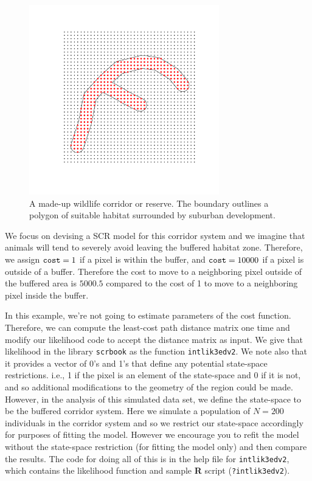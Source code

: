 \begin{figure}[h]
\begin{center}
\includegraphics[height=3.25in,width=3.25in]{Ch10-EcolDist/figs/corridor}
\end{center}
\caption{A made-up wildlife corridor or reserve. The boundary outlines
  a polygon of suitable habitat surrounded by suburban development.}
\label{ecoldist.fig.corridor}
\end{figure}


We focus on devising a SCR model for this corridor system and we
imagine that animals will tend to severely avoid leaving the buffered
habitat zone. Therefore, we assign $\mbox{\tt cost}=1$ if a pixel
is within the buffer,
and $\mbox{\tt cost} = 10000$ if a pixel is outside of a
buffer. Therefore the cost to move to a neighboring pixel outside of
the buffered area is $5000.5$ compared to the cost of 1 to move to a
neighboring pixel inside the buffer.

In this example, we're not going to estimate parameters of the cost
function. Therefore, we can compute the least-cost path 
distance matrix one time and modify our likelihood code to accept the
distance matrix as input. We give that likelihood in the library
\mbox{\tt scrbook} as the function \mbox{\tt intlik3edv2}.
We note also that it provides a vector of 0's and 1's that
define any potential state-space restrictions. i.e., 1 if the pixel is
an element of the state-space and 0 if it is not, and so additional
modifications to the geometry of the region could be made.
However, in the analysis of this
simulated data set, we define the state-space to be the buffered
corridor system. 
Here we simulate a population of $N=200$ individuals in the corridor system and so we
restrict our state-space accordingly for purposes of fitting the
model. However we encourage you to refit the model without the
state-space restriction (for fitting the model only) and then
compare the results.  The code for doing all of this is
in the help file for \mbox{\tt intlik3edv2}, which contains the
likelihood function and sample {\bf R} script (\mbox{\tt ?intlik3edv2}). 

